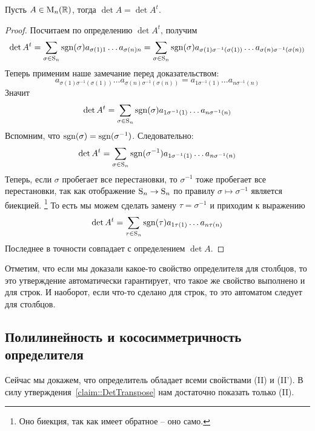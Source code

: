 \begin{claim}\label{claim::DetTranspose}
Пусть $A\in \operatorname{M}_{n}(\mathbb R)$, тогда $\det A = \det A^t$.
\end{claim}
\begin{proof}
Посчитаем по определению $\det A^t$, получим
\[
\det A^t = \sum_{\sigma\in\operatorname{S}_{n}}\operatorname{sgn}(\sigma)a_{\sigma(1)1} \ldots a_{\sigma(n)n} = 
\sum_{\sigma\in\operatorname{S}_{n}}\operatorname{sgn}(\sigma)a_{\sigma(1)\sigma^{-1}(\sigma(1))} \ldots a_{\sigma(n)\sigma^{-1}(\sigma(n))}
\]
Теперь применим наше замечание перед доказательством:
\[
a_{\sigma(1)\sigma^{-1}(\sigma(1))} \ldots a_{\sigma(n)\sigma^{-1}(\sigma(n))}
=
a_{1 \sigma^{-1}(1)}\ldots a_{n\sigma^{-1}(n)}
\]
Значит
\[
\det A^t = \sum_{\sigma\in\operatorname{S}_{n}}\operatorname{sgn}(\sigma) a_{1 \sigma^{-1}(1)}\ldots a_{n\sigma^{-1}(n)}
\]
Вспомним, что $\operatorname{sgn}(\sigma) = \operatorname{sgn}(\sigma^{-1})$.
Следовательно:
\[
\det A^t = \sum_{\sigma\in\operatorname{S}_{n}}\operatorname{sgn}(\sigma^{-1}) a_{1 \sigma^{-1}(1)}\ldots a_{n\sigma^{-1}(n)}
\]
Теперь, если $\sigma$ пробегает все перестановки, то $\sigma^{-1}$ тоже пробегает все перестановки, так как отображение $\operatorname{S}_{n}\to \operatorname{S}_{n}$ по правилу $\sigma\mapsto \sigma^{-1}$ является биекцией.%
\footnote{Оно биекция, так как имеет обратное -- оно само.}
То есть мы можем сделать замену $\tau = \sigma^{-1}$ и приходим к выражению
\[
\det A^t = \sum_{\tau\in\operatorname{S}_{n}}\operatorname{sgn}(\tau)a_{1\tau(1)}\ldots a_{n\tau(n)}
\]
Последнее в точности совпадает с определением $\det A$.
\end{proof}

Отметим, что если мы доказали какое-то свойство определителя для столбцов, то это утверждение автоматически гарантирует, что такое же свойство выполнено и для строк.
И наоборот, если что-то сделано для строк, то это автоматом следует для столбцов.

\subsection{Полилинейность и кососимметричность определителя}

Сейчас мы докажем, что определитель обладает всеми свойствами (II) и (II').
В силу утверждения~\ref{claim::DetTranspose} нам достаточно показать только (II).

